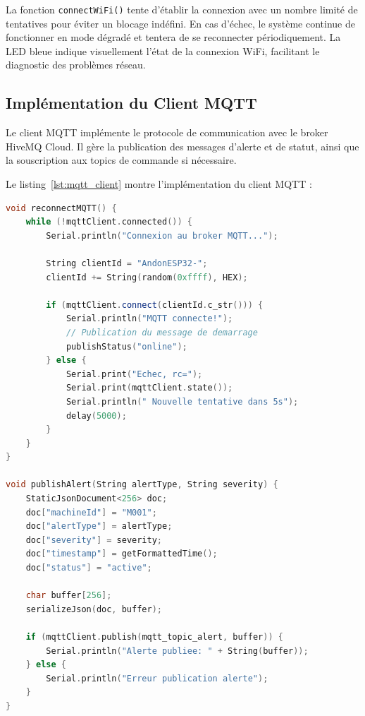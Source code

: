La fonction \texttt{connectWiFi()} tente d'établir la connexion avec un nombre limité de tentatives pour éviter un blocage indéfini. En cas d'échec, le système continue de fonctionner en mode dégradé et tentera de se reconnecter périodiquement. La LED bleue indique visuellement l'état de la connexion WiFi, facilitant le diagnostic des problèmes réseau.

\subsection{Implémentation du Client MQTT}
\label{subsec:impl_mqtt_client}

Le client MQTT implémente le protocole de communication avec le broker HiveMQ Cloud. Il gère la publication des messages d'alerte et de statut, ainsi que la souscription aux topics de commande si nécessaire.

Le listing~\ref{lst:mqtt_client} montre l'implémentation du client MQTT :

\begin{lstlisting}[language=C++, caption={Implémentation du client MQTT avec gestion des erreurs}, label={lst:mqtt_client}, captionpos=b]
void reconnectMQTT() {
    while (!mqttClient.connected()) {
        Serial.println("Connexion au broker MQTT...");
        
        String clientId = "AndonESP32-";
        clientId += String(random(0xffff), HEX);
        
        if (mqttClient.connect(clientId.c_str())) {
            Serial.println("MQTT connecte!");
            // Publication du message de demarrage
            publishStatus("online");
        } else {
            Serial.print("Echec, rc=");
            Serial.print(mqttClient.state());
            Serial.println(" Nouvelle tentative dans 5s");
            delay(5000);
        }
    }
}

void publishAlert(String alertType, String severity) {
    StaticJsonDocument<256> doc;
    doc["machineId"] = "M001";
    doc["alertType"] = alertType;
    doc["severity"] = severity;
    doc["timestamp"] = getFormattedTime();
    doc["status"] = "active";
    
    char buffer[256];
    serializeJson(doc, buffer);
    
    if (mqttClient.publish(mqtt_topic_alert, buffer)) {
        Serial.println("Alerte publiee: " + String(buffer));
    } else {
        Serial.println("Erreur publication alerte");
    }
}
\end{lstlisting}

